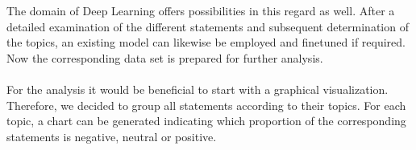 The domain of Deep Learning offers possibilities in this regard as well.
After a detailed examination of the different statements and subsequent determination of the topics, an existing model can likewise be employed and finetuned if required.
\\
Now the corresponding data set is prepared for further analysis.
\\
\\
For the analysis it would be beneficial to start with a graphical visualization.
Therefore, we decided to group all statements according to their topics.
For each topic, a chart can be generated indicating which proportion of the corresponding statements is negative, neutral or positive.


\begin{table}
\setlength\tabcolsep{2pt} %
\footnotesize\centering
\captionsetup{size=footnotesize}
\resizebox{\columnwidth}{!}{%
\begin{tabular}{
    cccc}

\hline

\textbf{statement} & \textbf{Sentiment} & \textbf{Topic} & \textbf{url} \\
\hline
AI can be a risk for many workers. & NEG & job market & ...\\
AI will definitely revolutionize games! & POS &  gaming & ...\\
... & ... & ... & ...\\
\hline
\end{tabular}}
\caption{\label{data-schema}
Data schema for visualization and analysis
}
\end{table}
